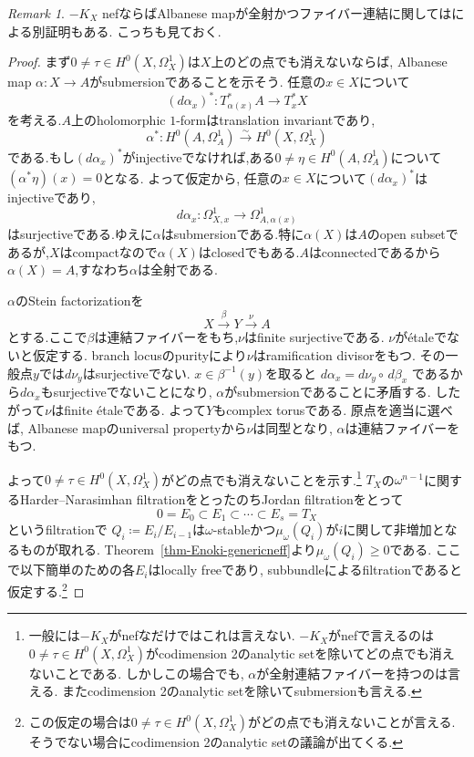 \documentclass[dvipdfmx,a4paper,11pt]{article} %
\theoremstyle{definition}
\theoremstyle{remark}
\newtheorem{rem}[thm]{Remark}
\numberwithin{equation}{section}
\begin{document}
\begin{rem}
\label{rem-cao-nefanti}
$-K_X$ nefならばAlbanese mapが全射かつファイバー連結に関しては\cite{Cao13}による別証明もある. こっちも見ておく. 
\begin{proof}
まず$0\neq\tau\in H^0(X,\Omega_X^1)$は$X$上のどの点でも消えないならば, 
Albanese map $\alpha \colon X \to A$がsubmersionであることを示そう.
任意の$x\in X$について
\[
(d\alpha_x)^*\colon T_{\alpha(x)}^*A\longrightarrow T_x^*X
\]
を考える.$A$上のholomorphic $1$-formはtranslation invariantであり,
\[
\alpha^*\colon H^0(A,\Omega_A^1)\xrightarrow{\sim}H^0(X,\Omega_X^1)
\]
である.もし$(d\alpha_x)^*$がinjectiveでなければ,ある$0\neq\eta\in H^0(A,\Omega_A^1)$について$(\alpha^*\eta)(x)=0$となる. 
よって仮定から, 任意の$x\in X$について$(d\alpha_x)^*$はinjectiveであり,
\[
d\alpha_x
\colon \Omega_{X, x}^{1}
\longrightarrow 
 \Omega_{A, \alpha(x)}^{1}
\]はsurjectiveである.ゆえに$\alpha$はsubmersionである.特に$\alpha(X)$は$A$のopen subsetであるが,$X$はcompactなので$\alpha(X)$はclosedでもある.$A$はconnectedであるから$\alpha(X)=A$,すなわち$\alpha$は全射である.

$\alpha$のStein factorizationを
\[
X\xrightarrow{\beta}Y\xrightarrow{\nu}A
\]
とする.ここで$\beta$は連結ファイバーをもち,$\nu$はfinite surjectiveである.
$\nu$が\'etaleでないと仮定する.
branch locusのpurityにより$\nu$はramification divisorをもつ.
その一般点$y$では$d\nu_y$はsurjectiveでない.
$x\in\beta^{-1}(y)$を取ると
\(
d\alpha_x=d\nu_y\circ\,d\beta_x
\)
であるから$d\alpha_x$もsurjectiveでないことになり, $\alpha$がsubmersionであることに矛盾する.
したがって$\nu$はfinite \'etaleである.
よって$Y$もcomplex torusである.
原点を適当に選べば, Albanese mapのuniversal propertyから$\nu$は同型となり, $\alpha$は連結ファイバーをもつ.

よって$0\neq\tau\in H^0(X,\Omega_X^1)$がどの点でも消えないことを示す.\footnote{一般には$-K_X$がnefなだけではこれは言えない. $-K_X$がnefで言えるのは$0\neq\tau\in H^0(X,\Omega_X^1)$がcodimension 2のanalytic setを除いてどの点でも消えないことである. しかしこの場合でも, $\alpha$が全射連結ファイバーを持つのは言える. またcodimension 2のanalytic setを除いてsubmersionも言える. }
$T_X$の$\omega^{n-1}$に関するHarder--Narasimhan filtrationをとったのちJordan filtrationをとって
\[
0=E_0\subset E_1\subset\cdots\subset E_s=T_X
\]
というfiltrationで
$Q_i\coloneqq E_i/E_{i-1}$は$\omega$-stableかつ$\mu_\omega(Q_i)$が$i$に関して非増加となるものが取れる. Theorem~\ref{thm-Enoki-genericneff}より$\mu_\omega(Q_i)\geq0$である.
ここで以下簡単のための各$E_i$はlocally freeであり, subbundleによるfiltrationであると仮定する.\footnote{この仮定の場合は$0\neq\tau\in H^0(X,\Omega_X^1)$がどの点でも消えないことが言える.そうでない場合にcodimension 2のanalytic setの議論が出てくる. }


\end{proof}
\end{rem}
\end{document}
